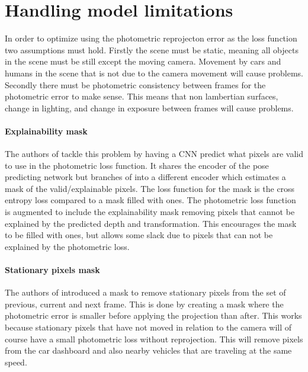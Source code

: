 \section{Handling model limitations}
\label{sec:modellimit}

In order to optimize using the photometric reprojecton error as the loss function two assumptions must hold. Firstly the scene must be static, meaning all objects in the scene must be still except the moving camera. Movement by cars and humans in the scene that is not due to the camera movement will cause problems. Secondly there must be photometric consistency between frames for the photometric error to make sense. This means that non lambertian surfaces, change in lighting, and change in exposure between frames will cause problems.

\paragraph{Explainability mask} The authors of \cite{sfmlearner} tackle this problem by having a CNN predict what pixels are valid to use in the photometric loss function. It shares the encoder of the pose predicting network but branches of into a different encoder which estimates a mask of the valid/explainable pixels. The loss function for the mask is the cross entropy loss compared to a mask filled with ones. The photometric loss function is augmented to include the explainability mask removing pixels that cannot be explained by the predicted depth and transformation. This encourages the mask to be filled with ones, but allows some slack due to pixels that can not be explained by the photometric loss.

\paragraph{Stationary pixels mask} The authors of \cite{monodepth2} introduced a mask to remove stationary pixels from the set of previous, current and next frame. This is done by creating a mask where the photometric error is smaller before applying the projection than after. This works because stationary pixels that have not moved in relation to the camera will of course have a small photometric loss without reprojection. This will remove pixels from the car dashboard and also nearby vehicles that are traveling at the same speed.